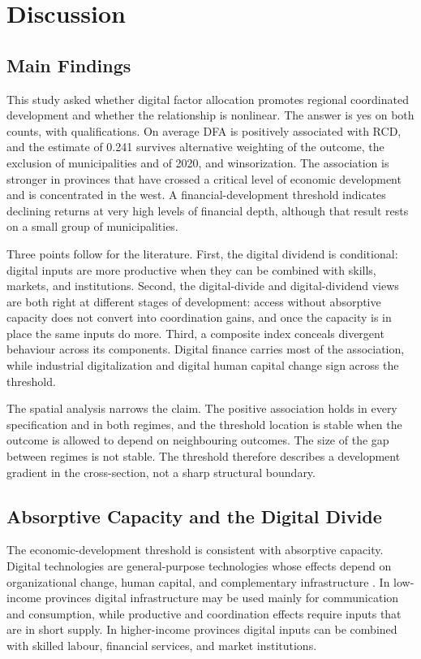 \section{Discussion}\label{sec:discussion}

\subsection{Main Findings}

This study asked whether digital factor allocation promotes regional coordinated development and whether the relationship is nonlinear. The answer is yes on both counts, with qualifications. On average DFA is positively associated with RCD, and the estimate of 0.241 survives alternative weighting of the outcome, the exclusion of municipalities and of 2020, and winsorization. The association is stronger in provinces that have crossed a critical level of economic development and is concentrated in the west. A financial-development threshold indicates declining returns at very high levels of financial depth, although that result rests on a small group of municipalities.

Three points follow for the literature. First, the digital dividend is conditional: digital inputs are more productive when they can be combined with skills, markets, and institutions. Second, the digital-divide and digital-dividend views are both right at different stages of development: access without absorptive capacity does not convert into coordination gains, and once the capacity is in place the same inputs do more. Third, a composite index conceals divergent behaviour across its components. Digital finance carries most of the association, while industrial digitalization and digital human capital change sign across the threshold.

The spatial analysis narrows the claim. The positive association holds in every specification and in both regimes, and the threshold location is stable when the outcome is allowed to depend on neighbouring outcomes. The size of the gap between regimes is not stable. The threshold therefore describes a development gradient in the cross-section, not a sharp structural boundary.

\subsection{Absorptive Capacity and the Digital Divide}

The economic-development threshold is consistent with absorptive capacity. Digital technologies are general-purpose technologies whose effects depend on organizational change, human capital, and complementary infrastructure \citep{brynjolfsson2014,omahony2005}. In low-income provinces digital infrastructure may be used mainly for communication and consumption, while productive and coordination effects require inputs that are in short supply. In higher-income provinces digital inputs can be combined with skilled labour, financial services, and market institutions.

